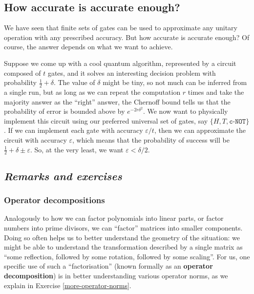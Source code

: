 \documentclass[fleqn,a4paper]{article}
\renewcommand{\footnote}[1]{\sidenotetext[{\color{white}0}\!\!]{\footnotesize #1}}
\theoremstyle{definition}
\theoremstyle{definition}
\theoremstyle{definition}
\theoremstyle{definition}
\theoremstyle{remark}
\begin{document}
\hypertarget{how-accurate-is-accurate-enough}{%
\subsection{How accurate is accurate enough?}\label{how-accurate-is-accurate-enough}}

We have seen that finite sets of gates can be used to approximate any unitary operation with any prescribed accuracy.
But how accurate is accurate enough?
Of course, the answer depends on what we want to achieve.

Suppose we come up with a cool quantum algorithm, represented by a circuit composed of \(t\) gates, and it solves an interesting decision problem with probability \(\frac{1}{2}+\delta\).
The value of \(\delta\) might be tiny, so not much can be inferred from a single run, but as long as we can repeat the computation \(r\) times and take the majority answer as the ``right'' answer, the Chernoff bound\footnote{Recall Exercise \ref{imperfect-decision-maker}.} tells us that the probability of error is bounded above by \(e^{-2r\delta^2}\).
We now want to physically implement this circuit using our preferred universal set of gates, say \(\{H,T,\texttt{c-NOT}\}\).
If we can implement each gate with accuracy \(\varepsilon/t\), then we can approximate the circuit with accuracy \(\varepsilon\), which means that the probability of success will be \(\frac{1}{2}+\delta\pm\varepsilon\).
So, at the very least, we want \(\varepsilon<\delta/2\).

\hypertarget{remarks-and-exercises-approximations}{%
\subsection{\texorpdfstring{\emph{Remarks and exercises}}{Remarks and exercises}}\label{remarks-and-exercises-approximations}}

\hypertarget{operator-decompositions}{%
\subsubsection{Operator decompositions}\label{operator-decompositions}}

Analogously to how we can factor polynomials into linear parts, or factor numbers into prime divisors, we can ``factor'' matrices into smaller components.
Doing so often helps us to better understand the geometry of the situation: we might be able to understand the transformation described by a single matrix as ``some reflection, followed by some rotation, followed by some scaling''.
For us, one specific use of such a ``factorisation'' (known formally as an \textbf{operator decomposition}) is in better understanding various operator norms, as we explain in Exercise \ref{more-operator-norms}.
\end{document}
